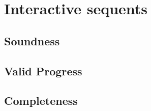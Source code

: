 \setchapterpreamble[u]{\margintoc}
\chapter{Interactive sequents}

\section{Soundness}


\section{Valid Progress}



\section{Completeness}

